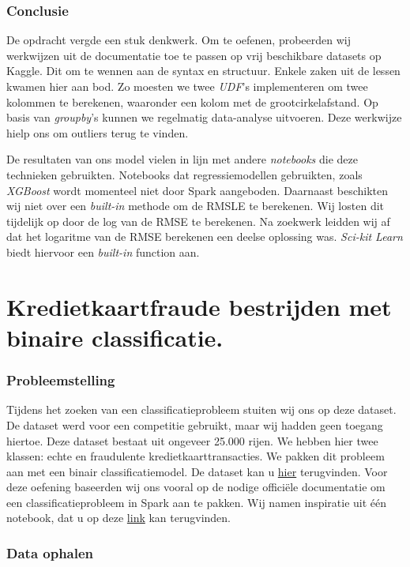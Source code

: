 \documentclass[a4paper,10pt,twoside]{report}
\begin{document}
\subsection*{Conclusie}

De opdracht vergde een stuk denkwerk. Om te oefenen, probeerden wij werkwijzen uit de documentatie toe te passen op vrij beschikbare datasets op Kaggle. Dit om te wennen aan de syntax en structuur. Enkele zaken uit de lessen kwamen hier aan bod. Zo moesten we twee \textit{UDF}'s implementeren om twee kolommen te berekenen, waaronder een kolom met de grootcirkelafstand. Op basis van \textit{groupby}'s kunnen we regelmatig data-analyse uitvoeren. Deze werkwijze hielp ons om outliers terug te vinden.

De resultaten van ons model vielen in lijn met andere \textit{notebooks} die deze technieken gebruikten. Notebooks dat regressiemodellen gebruikten, zoals \textit{XGBoost} wordt momenteel niet door Spark aangeboden. Daarnaast beschikten wij niet over een \textit{built-in} methode om de RMSLE te berekenen. Wij losten dit tijdelijk op door de log van de RMSE te berekenen. Na zoekwerk leidden wij af dat het logaritme van de RMSE berekenen een deelse oplossing was. \textit{Sci-kit Learn} biedt hiervoor een \textit{built-in} function aan.

\chapter{Kredietkaartfraude bestrijden met binaire classificatie. }

\subsection*{Probleemstelling}

Tijdens het zoeken van een classificatieprobleem stuiten wij ons op deze dataset. De dataset werd voor een competitie gebruikt, maar wij hadden geen toegang hiertoe. Deze dataset bestaat uit ongeveer 25.000 rijen. We hebben hier twee klassen: echte en fraudulente kredietkaarttransacties. We pakken dit probleem aan met een binair classificatiemodel. De dataset kan u \href{http://bit.ly/3iM6zIB}{hier} terugvinden. Voor deze oefening baseerden wij ons vooral op de nodige officiële documentatie om een classificatieprobleem in Spark aan te pakken. Wij namen inspiratie uit één notebook, dat u op deze \href{https://bit.ly/3Y9Kmo6}{link} kan terugvinden.

\subsection*{Data ophalen}
\end{document}
